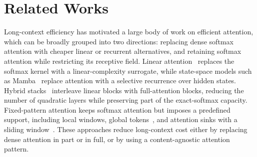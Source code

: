 \section{Related Works}
\label{sec:related-works}

Long-context efficiency has motivated a large body of work on efficient attention, which can be broadly grouped into two directions: replacing dense softmax attention with cheaper linear or recurrent alternatives, and retaining softmax attention while restricting its receptive field.
Linear attention~\citep{katharopoulos2020linear,choromanski2020performer} replaces the softmax kernel with a linear-complexity surrogate, while state-space models such as Mamba~\citep{gu2023mamba} replace attention with a selective recurrence over hidden states.
Hybrid stacks~\citep{minimax01,minimaxm1} interleave linear blocks with full-attention blocks, reducing the number of quadratic layers while preserving part of the exact-softmax capacity.
Fixed-pattern attention keeps softmax attention but imposes a predefined support, including local windows, global tokens~\citep{beltagy2020longformer,zaheer2020bigbird}, and attention sinks with a sliding window~\citep{xiao2023streaming}.
These approaches reduce long-context cost either by replacing dense attention in part or in full, or by using a content-agnostic attention pattern.

